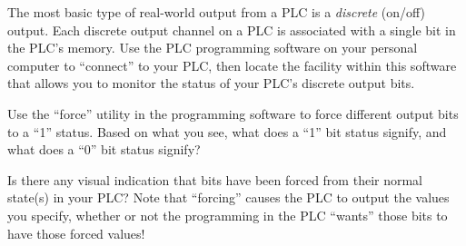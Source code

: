 

The most basic type of real-world output from a PLC is a {\it discrete} (on/off) output.  Each discrete output channel on a PLC is associated with a single bit in the PLC's memory.  Use the PLC programming software on your personal computer to ``connect'' to your PLC, then locate the facility within this software that allows you to monitor the status of your PLC's discrete output bits.

\vskip 10pt

Use the ``force'' utility in the programming software to force different output bits to a ``1'' status.  Based on what you see, what does a ``1'' bit status signify, and what does a ``0'' bit status signify?

\vskip 10pt

Is there any visual indication that bits have been forced from their normal state(s) in your PLC?  Note that ``forcing'' causes the PLC to output the values you specify, whether or not the programming in the PLC ``wants'' those bits to have those forced values!




\noindent

